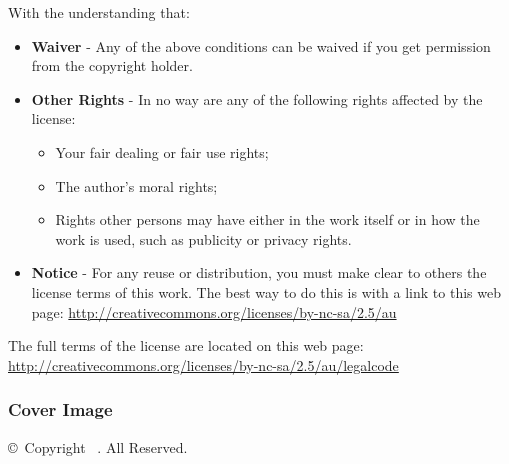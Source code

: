 \begin{flushleft}
\begin{small}
With the understanding that:
\begin{itemize}
	\item \textbf{Waiver} - Any of the above conditions can be waived if you get permission from the copyright holder.
	\item \textbf{Other Rights} - In no way are any of the following rights affected by the license:
	\begin{itemize}
		\item Your fair dealing or fair use rights;
		\item The author's moral rights;
		\item Rights other persons may have either in the work itself or in how the work is used, such as publicity or privacy rights.
	\end{itemize}
	\item \textbf{Notice} - For any reuse or distribution, you must make clear to others the license terms of this work. The best way to do this is with a link to this web page: \url{http://creativecommons.org/licenses/by-nc-sa/2.5/au}
\end{itemize}

The full terms of the license are located on this web page: \url{http://creativecommons.org/licenses/by-nc-sa/2.5/au/legalcode}

\subsubsection*{Cover Image}
\copyright\ Copyright \mybookdate\ \mybookauthor. All Reserved. \\

\end{small}
\end{flushleft}
